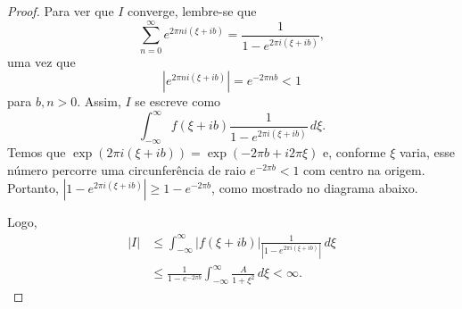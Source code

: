 \begin{proof}
        Para ver que $I$ converge, lembre-se que
        \begin{equation*}
            \sum_{n=0}^{\infty} e^{2\pi n i(\xi + ib)} = \frac{1}{1 - e^{2\pi i(\xi + ib)}},
        \end{equation*}
        uma vez que
        \begin{equation*}
            |e^{2\pi n i(\xi + ib)}| = e^{-2\pi nb} < 1
        \end{equation*}
        para $b,n > 0$. Assim, $I$ se escreve como
        \begin{equation*}
            \int_{-\infty}^{\infty} f(\xi + ib)\frac{1}{1 - e^{2\pi i(\xi + ib)}}\,d\xi.
        \end{equation*}
        Temos que $\exp(2\pi i (\xi + ib)) = \exp(-2\pi b + i2\pi \xi)$ e, 
        conforme $\xi$ varia, esse número percorre uma circunferência de raio 
        $e^{-2\pi b} < 1$ com centro na origem. Portanto, 
        $|1 - e^{2\pi i(\xi + ib)}| \geq 1 - e^{-2\pi b}$, como mostrado no 
        diagrama abaixo.
        \begin{figure}[H]
            \centering
        \end{figure}
        Logo,
        \begin{align*}
            |I| &\leq \int_{-\infty}^{\infty}|f(\xi + ib)|\frac{1}{|1 - e^{2\pi i(\xi + ib)}|} \, d\xi \\
            &\leq \frac{1}{1 - e^{-2\pi b}}\int_{-\infty}^{\infty} \frac{A}{1 + \xi^2} \, d\xi < \infty.

\end{align*}
\end{proof}

